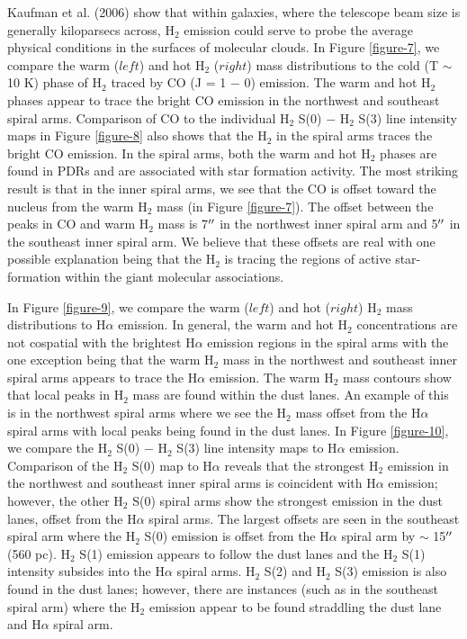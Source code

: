 \documentclass[manuscript]{aastex}
\begin{document}
Kaufman et al. (2006) show that within galaxies, where the
telescope beam size is generally kiloparsecs across, $\mathrm{H_2}$
emission could serve to probe the average physical 
conditions in the surfaces of molecular clouds.  In Figure 
\ref{figure-7}, we compare the warm ($left$) and hot
$\mathrm{H_2}$ ($right$) mass distributions to the cold (T $\sim$ 10 K) 
phase of H$_2$ traced by CO (J = 1 $-$ 0) emission.  The warm and hot 
H$_2$ phases appear to trace the bright CO emission
in the northwest and southeast spiral arms. Comparison 
of CO to the individual H$_2$  S(0) $-$ H$_2$ S(3) line intensity 
maps in Figure \ref{figure-8} also shows that the H$_2$ in 
the spiral arms traces the bright CO emission.  
In the spiral arms, both the warm and hot H$_2$ 
phases are found in PDRs and are associated 
with star formation activity.  The most 
striking result is that in the inner spiral arms, we see that the
CO is offset toward the nucleus from the 
warm $\mathrm{H_2}$ mass (in Figure \ref{figure-7}).
The offset between the peaks in CO and warm $\mathrm{H_2}$ mass is
7$\mbox{$^{\prime\prime}$}$ in the northwest inner spiral arm and 5$\mbox{$^{\prime\prime}$}$ in the
southeast inner spiral arm.  We believe that these offsets are real with
one possible explanation being that the $\mathrm{H_2}$ is tracing the
regions of active star-formation within the giant molecular
associations.  

In Figure \ref{figure-9}, we compare the warm ($left$) and hot ($right$)
$\mathrm{H_2}$ mass distributions to H$\alpha$ emission.  In general,
the warm and hot $\mathrm{H_2}$ concentrations are not cospatial with
the brightest H$\alpha$ emission regions in the spiral arms with the one
exception being that the warm $\mathrm{H_2}$ mass in 
the northwest and southeast inner spiral
arms appears to trace the H$\alpha$ emission.  The warm $\mathrm{H_2}$
mass contours show that local peaks in $\mathrm{H_2}$ mass are found
within the dust lanes.  An example of this is in the northwest spiral
arms where we see the $\mathrm{H_2}$ mass offset from the H$\alpha$
spiral arms with local peaks being found in the dust lanes.
In Figure \ref{figure-10}, we compare the $\mathrm{H_2}$ S(0) $-$
$\mathrm{H_2}$ S(3) line intensity maps to H$\alpha$ emission.
Comparison of the $\mathrm{H_2}$ S(0) map to H$\alpha$ reveals that
the strongest $\mathrm{H_2}$ emission in the northwest and southeast
inner spiral arms is coincident with H$\alpha$ emission; however, the
other $\mathrm{H_2}$ S(0) spiral arms show the strongest emission in
the dust lanes, offset from the H$\alpha$ spiral arms.  The largest
offsets are seen in the southeast spiral arm where the $\mathrm{H_2}$
S(0) emission is offset from the H$\alpha$ spiral arm by $\sim$
15$\mbox{$^{\prime\prime}$}$ (560 pc).  $\mathrm{H_2}$ S(1) emission appears to follow
the dust lanes and the $\mathrm{H_2}$ S(1) intensity subsides into the
H$\alpha$ spiral arms.  $\mathrm{H_2}$ S(2) and $\mathrm{H_2}$ S(3)
emission is also found in the dust lanes; however, there are instances
(such as in the southeast spiral arm) where the $\mathrm{H_2}$
emission appear to be found straddling the dust lane and H$\alpha$
spiral arm.
\end{document}
